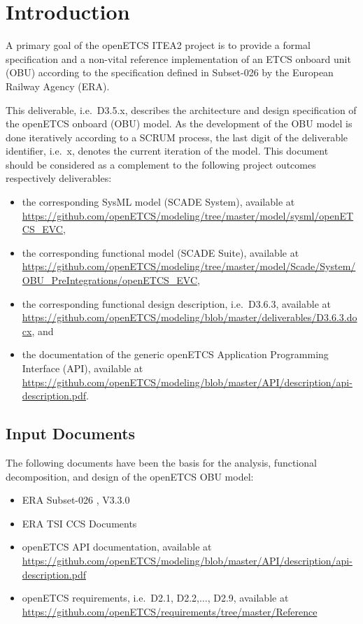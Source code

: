
\chapter{Introduction}

A primary goal of the openETCS ITEA2 project is to provide a formal specification and a non-vital reference implementation of an ETCS onboard unit (OBU) according to the specification defined in Subset-026 \cite{subset-026} by the European Railway Agency (ERA). 

This deliverable, i.e.~D3.5.x, describes the architecture and design specification of the openETCS onboard (OBU) model. As the development of the OBU model is done iteratively according to a SCRUM process, the last digit of the deliverable identifier, i.e.~x, denotes the current iteration of the model. This document should be considered as a complement to the following project outcomes respectively deliverables:
\begin{itemize}
\item the corresponding SysML model (SCADE System), available at \url{https://github.com/openETCS/modeling/tree/master/model/sysml/openETCS_EVC},
\item the corresponding functional model (SCADE Suite), available at \url{https://github.com/openETCS/modeling/tree/master/model/Scade/System/OBU_PreIntegrations/openETCS_EVC},
\item the corresponding functional design description, i.e.~D3.6.3, available at \url{https://github.com/openETCS/modeling/blob/master/deliverables/D3.6.3.docx}, and
\item the documentation of the generic openETCS Application Programming Interface (API), available at \url{https://github.com/openETCS/modeling/blob/master/API/description/api-description.pdf}.
\end{itemize}


\section{Input Documents}

The following documents have been the basis for the analysis, functional decomposition, and design of the openETCS OBU model:
\begin{itemize}
\item ERA Subset-026 \cite{subset-026}, V3.3.0
\item ERA TSI CCS Documents
\item openETCS API documentation, available at \url{https://github.com/openETCS/modeling/blob/master/API/description/api-description.pdf}
\item openETCS requirements, i.e.~D2.1, D2.2,$\ldots$, D2.9, available at \url{https://github.com/openETCS/requirements/tree/master/Reference}
\end{itemize}


